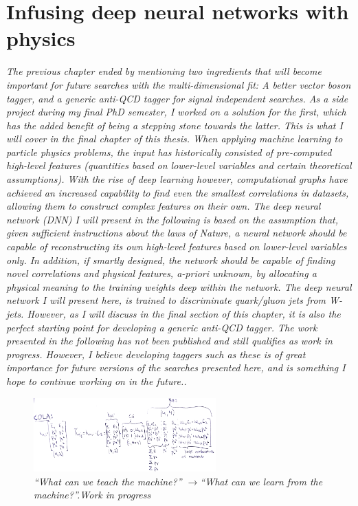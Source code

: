 \vspace*{\fill}
\section{Infusing deep neural networks with physics}
\label{sec:lolaintro}
\begin{centering}
\textit{
The previous chapter ended by mentioning two ingredients that will become important for future searches with the multi-dimensional fit: A better vector boson tagger, and a generic anti-QCD tagger for signal independent searches. As a side project during my final PhD semester, I worked on a solution for the first, which has the added benefit of being a stepping stone towards the latter. This is what I will cover in the final chapter of this thesis.
\newline
\newline
When applying machine learning to particle physics problems, the input has historically consisted of pre-computed high-level features (quantities based on lower-level variables and certain theoretical assumptions).
With the rise of deep learning however, computational graphs have achieved an increased capability to find even the smallest correlations in datasets, allowing them to construct complex features on their own. The deep neural network (DNN) I will present in the following is based on the assumption that, given sufficient instructions about the laws of Nature, a neural network should be capable of reconstructing its own high-level features based on lower-level variables only. In addition, if smartly designed, the network should be capable of finding novel correlations and physical features, a-priori unknown, by allocating a physical meaning to the training weights deep within the network. The deep neural network I will present here, is trained to discriminate quark/gluon jets from W-jets. However, as I will discuss in the final section of this chapter, it is also the perfect starting point for developing a generic anti-QCD tagger.
\newline
\newline
The work presented in the following has not been published and still qualifies as work in progress. However, I believe developing taggers such as these is of great importance for future versions of the searches presented here, and is something I hope to continue working on in the future..
}
\begin{figure}[b!] 
    \centering
    \includegraphics[width=7cm]{figures/vtagging/misc/cola.png}
    \vspace*{5mm}
    \caption*{\footnotesize{\textit{ ``What can we teach the machine?'' $\rightarrow$``What can we learn from the machine?''.\newline Work in progress}}}
\end{figure}
\end{centering}
\clearpage
